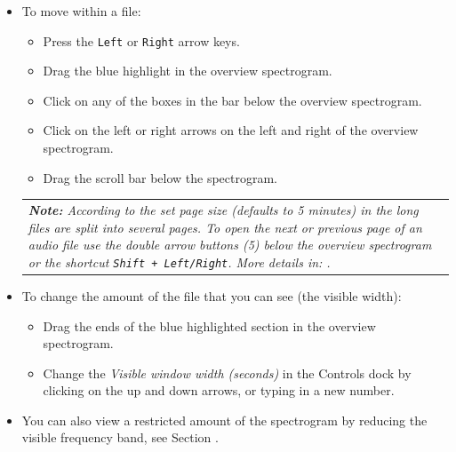 \documentclass{scrartcl}
\begin{document}
\begin{itemize}
	\item To move within a file:
	\begin{itemize}
		\item Press the \texttt{Left} or \texttt{Right} arrow keys.
		\item Drag the blue highlight in the overview spectrogram. 
		\item Click on any of the boxes in the bar below the overview spectrogram.
		\item Click on the left or right arrows on the left and right of the overview spectrogram.
		\item Drag the scroll bar below the spectrogram.
	\end{itemize}
	\begin{table}[h!]
		\centering
		\begin{tabular}{p{}}
			\textit{\textbf{Note:} According to the set page size (defaults to 5 minutes) in the \textit{\nameref{sec:interfacesettings}} long files are split into several pages. To open the next or previous page of an audio file use the double arrow buttons (5) below the overview spectrogram or the shortcut \texttt{Shift + Left/Right}. More details in: \nameref{sec:longfiles}.}\\
		\end{tabular}
	\end{table}

	\item To change the amount of the file that you can see (the visible width): 
	\begin{itemize}
		\item Drag the ends of the blue highlighted section in the overview spectrogram.
		\item Change the \textit{Visible window width (seconds)} in the Controls dock by clicking on the up and down arrows, or typing in a new number.
	\end{itemize}

\item You can also view a restricted amount of the spectrogram by reducing the visible frequency band, see Section . 
\end{itemize}
\end{document}

